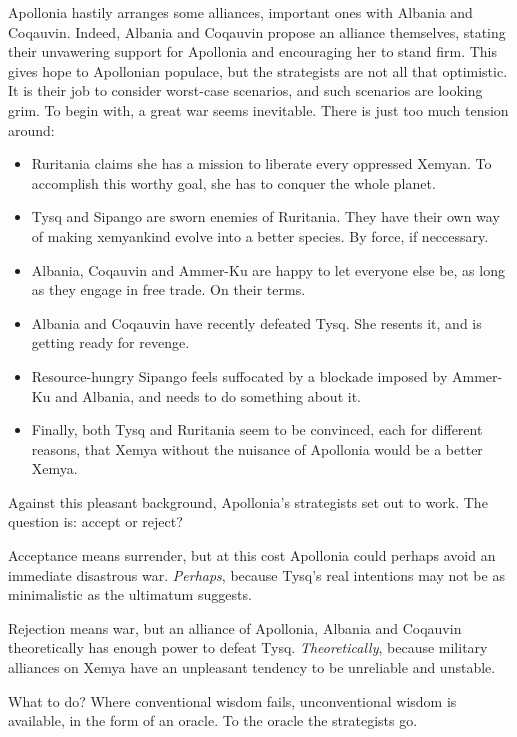 \documentclass{amsart}
\begin{document}
Apollonia hastily arranges some alliances, important ones with Albania and
Coqauvin. Indeed, Albania and Coqauvin propose an alliance themselves,
stating their unvawering support for Apollonia and encouraging her to stand firm. 
This gives hope to Apollonian populace, but the strategists are not all that
optimistic. It is their job to consider worst-case scenarios, and such scenarios
are looking grim. To begin with, a great war seems inevitable.
There is just too much tension around:
\begin{itemize}  
\item Ruritania claims she has a mission to liberate every oppressed Xemyan.
      To accomplish this worthy goal, she has to conquer the whole planet.
\item Tysq and Sipango are sworn enemies of Ruritania. They have their
      own way of making xemyankind evolve into a better species.
      By force, if neccessary.
\item Albania, Coqauvin and Ammer-Ku are happy to let everyone else
    be, as long as they engage in free trade. On their terms. 
\item Albania and Coqauvin have recently defeated Tysq. She
    resents it, and is getting ready for revenge.
\item Resource-hungry Sipango feels suffocated by a blockade imposed by
      Ammer-Ku and Albania, and needs to do something about it.
\item Finally, both Tysq and Ruritania seem to be convinced, each for
      different reasons, that Xemya without the nuisance of Apollonia would
      be a better Xemya.   
\end{itemize}

Against this pleasant background, Apollonia's strategists set out to
work. The question is: accept or reject?

Acceptance means surrender, but at this cost Apollonia could
perhaps avoid an immediate disastrous war. \emph{Perhaps}, because Tysq's
real intentions may not be as minimalistic as the ultimatum suggests.

Rejection means war, but an alliance of Apollonia, Albania and Coqauvin
theoretically has enough power to defeat Tysq. \emph{Theoretically},
because military alliances on Xemya have an unpleasant tendency to be unreliable
and unstable.
  
What to do? Where conventional wisdom fails, unconventional wisdom
is available, in the form of an oracle. To the oracle the strategists
go.
\end{document}
